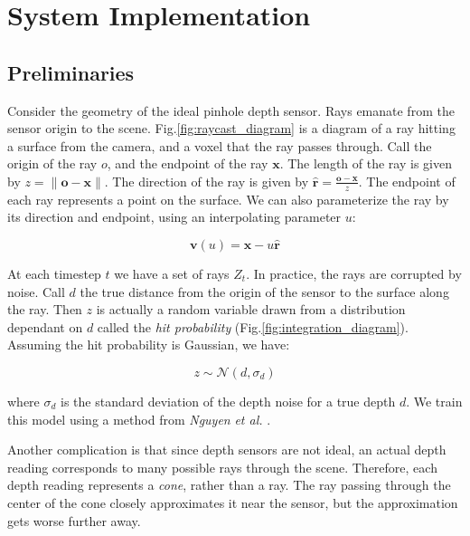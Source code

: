\documentclass[conference]{IEEEtran}
\newcommand{\figref}[1]{Fig.\ref{#1}}
\newcommand{\etal}{\textit{et al. }}
\begin{document}
\section{System Implementation} 
\subsection{Preliminaries}
\label{section:prelim}
Consider the geometry of the ideal pinhole depth sensor. Rays emanate from the
sensor origin to the scene.  \figref{fig:raycast_diagram} is a diagram of a ray hitting a
 surface from the camera, and a voxel that the ray passes through.  Call  the
 origin of the ray $o$, and the endpoint of the ray $\mathbf{x}$.
The length of the ray is given by $z = \|\mathbf{o}
- \mathbf{x}\|$. The direction of the ray is given by $\mathbf{\hat{r}} =
\frac{\mathbf{o} - \mathbf{x}}{z}$. The endpoint of each ray represents a point
on the surface.  We can also parameterize the ray by its direction and
endpoint, using an interpolating parameter $u$:

 \begin{equation}
 	\mathbf{v}(u) = \mathbf{x} - u\mathbf{\hat{r}}
 \end{equation}

At each timestep $t$ we have a set of rays $Z_t$. In practice, the rays are
corrupted by noise. Call $d$ the true distance from the origin of the sensor to
the surface along the ray. Then $z$ is actually a random variable drawn from a
distribution dependant on $d$ called the \textit{hit probability}
(\figref{fig:integration_diagram}). Assuming the hit probability is Gaussian, we
have:

\begin{equation}
\label{eqn:hitprobability}
z \sim \mathcal{N}(d, \sigma_d)
\end{equation}

\noindent where $\sigma_d$ is the standard deviation of the depth noise for a
true depth $d$. We train this model using a method from \textit{Nguyen} \etal
\cite{Nguyen2012}.

Another complication is that since depth sensors are not ideal, an actual depth
reading corresponds to many possible rays through the scene. Therefore, each
depth reading represents a \textit{cone}, rather than a ray. The ray passing
through the center of the cone closely approximates it near the sensor, but the
approximation gets worse further away.

\end{document}
